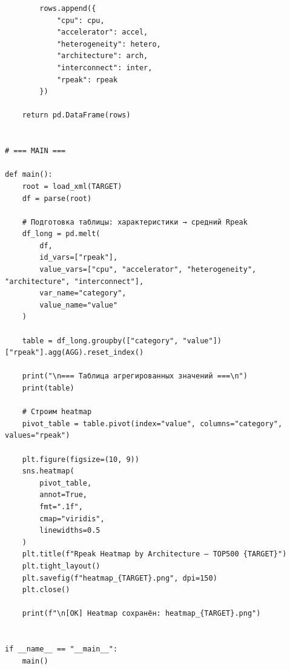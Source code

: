 \documentclass[14pt,a4paper]{extarticle}
\begin{document}
\begin{verbatim}
        rows.append({
            "cpu": cpu,
            "accelerator": accel,
            "heterogeneity": hetero,
            "architecture": arch,
            "interconnect": inter,
            "rpeak": rpeak
        })

    return pd.DataFrame(rows)


# === MAIN ===

def main():
    root = load_xml(TARGET)
    df = parse(root)

    # Подготовка таблицы: характеристики → средний Rpeak
    df_long = pd.melt(
        df,
        id_vars=["rpeak"],
        value_vars=["cpu", "accelerator", "heterogeneity", "architecture", "interconnect"],
        var_name="category",
        value_name="value"
    )

    table = df_long.groupby(["category", "value"])["rpeak"].agg(AGG).reset_index()

    print("\n=== Таблица агрегированных значений ===\n")
    print(table)

    # Строим heatmap
    pivot_table = table.pivot(index="value", columns="category", values="rpeak")

    plt.figure(figsize=(10, 9))
    sns.heatmap(
        pivot_table,
        annot=True,
        fmt=".1f",
        cmap="viridis",
        linewidths=0.5
    )
    plt.title(f"Rpeak Heatmap by Architecture — TOP500 {TARGET}")
    plt.tight_layout()
    plt.savefig(f"heatmap_{TARGET}.png", dpi=150)
    plt.close()

    print(f"\n[OK] Heatmap сохранён: heatmap_{TARGET}.png")


if __name__ == "__main__":
    main()
\end{verbatim}
\end{document}
